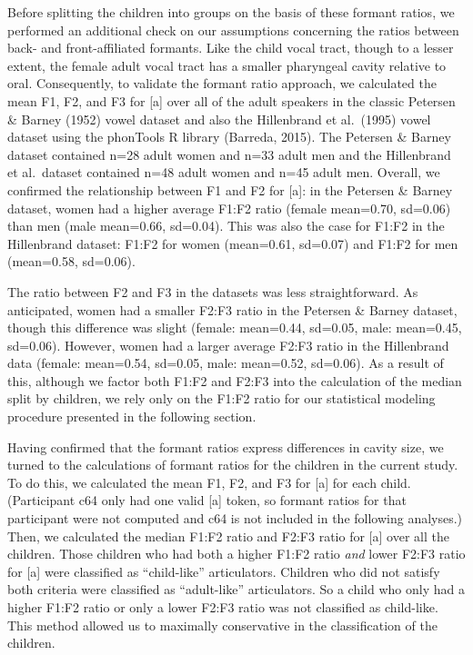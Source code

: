 \documentclass[
]{article}
\begin{document}
Before splitting the children into groups on the basis of these formant ratios, we performed an additional check on our assumptions concerning the ratios between back- and front-affiliated formants. Like the child vocal tract, though to a lesser extent, the female adult vocal tract has a smaller pharyngeal cavity relative to oral. Consequently, to validate the formant ratio approach, we calculated the mean F1, F2, and F3 for {[}a{]} over all of the adult speakers in the classic Petersen \& Barney (1952) vowel dataset and also the Hillenbrand et al.~(1995) vowel dataset using the phonTools R library (Barreda, 2015). The Petersen \& Barney dataset contained n=28 adult women and n=33 adult men and the Hillenbrand et al.~dataset contained n=48 adult women and n=45 adult men. Overall, we confirmed the relationship between F1 and F2 for {[}a{]}: in the Petersen \& Barney dataset, women had a higher average F1:F2 ratio (female mean=0.70, sd=0.06) than men (male mean=0.66, sd=0.04). This was also the case for F1:F2 in the Hillenbrand dataset: F1:F2 for women (mean=0.61, sd=0.07) and F1:F2 for men (mean=0.58, sd=0.06).

The ratio between F2 and F3 in the datasets was less straightforward. As anticipated, women had a smaller F2:F3 ratio in the Petersen \& Barney dataset, though this difference was slight (female: mean=0.44, sd=0.05, male: mean=0.45, sd=0.06). However, women had a larger average F2:F3 ratio in the Hillenbrand data (female: mean=0.54, sd=0.05, male: mean=0.52, sd=0.06). As a result of this, although we factor both F1:F2 and F2:F3 into the calculation of the median split by children, we rely only on the F1:F2 ratio for our statistical modeling procedure presented in the following section.

Having confirmed that the formant ratios express differences in cavity size, we turned to the calculations of formant ratios for the children in the current study. To do this, we calculated the mean F1, F2, and F3 for {[}a{]} for each child. (Participant c64 only had one valid {[}a{]} token, so formant ratios for that participant were not computed and c64 is not included in the following analyses.) Then, we calculated the median F1:F2 ratio and F2:F3 ratio for {[}a{]} over all the children. Those children who had both a higher F1:F2 ratio \emph{and} lower F2:F3 ratio for {[}a{]} were classified as ``child-like'' articulators. Children who did not satisfy both criteria were classified as ``adult-like'' articulators. So a child who only had a higher F1:F2 ratio or only a lower F2:F3 ratio was not classified as child-like. This method allowed us to maximally conservative in the classification of the children.
\end{document}
